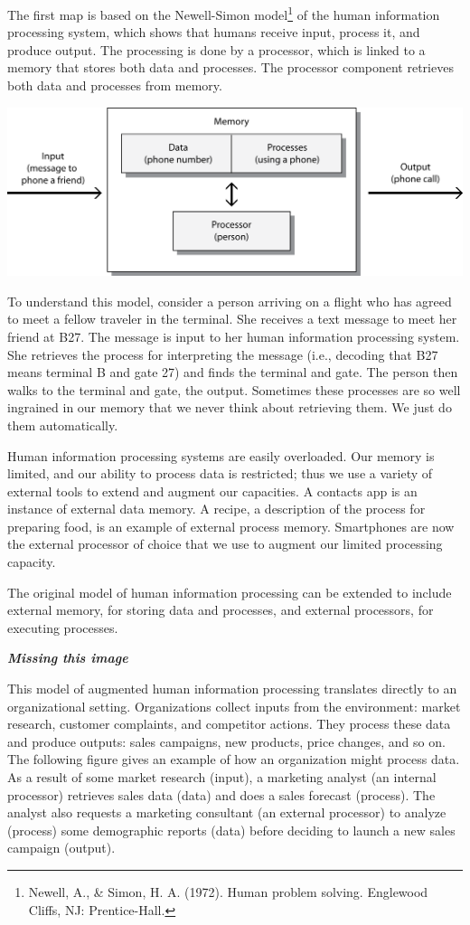 \documentclass[
]{article}
\begin{document}
The first map is based on the Newell-Simon model\footnote{Newell, A., \& Simon, H. A. (1972). Human problem solving.
  Englewood Cliffs, NJ: Prentice-Hall.} of the human
information processing system, which shows that humans receive input,
process it, and produce output. The processing is done by a processor,
which is linked to a memory that stores both data and processes. The
processor component retrieves both data and processes from memory.

\includegraphics{Figures/Section 1/Simon-Newell.png}

To understand this model, consider a person arriving on a flight who has
agreed to meet a fellow traveler in the terminal. She receives a text
message to meet her friend at B27. The message is input to her human
information processing system. She retrieves the process for
interpreting the message (i.e., decoding that B27 means terminal B and
gate 27) and finds the terminal and gate. The person then walks to the
terminal and gate, the output. Sometimes these processes are so well
ingrained in our memory that we never think about retrieving them. We
just do them automatically.

Human information processing systems are easily overloaded. Our memory
is limited, and our ability to process data is restricted; thus we use a
variety of external tools to extend and augment our capacities. A
contacts app is an instance of external data memory. A recipe, a
description of the process for preparing food, is an example of external
process memory. Smartphones are now the external processor of choice
that we use to augment our limited processing capacity.

The original model of human information processing can be extended to
include external memory, for storing data and processes, and external
processors, for executing processes.

\textbf{\emph{Missing this image}}

This model of augmented human information processing translates directly
to an organizational setting. Organizations collect inputs from the
environment: market research, customer complaints, and competitor
actions. They process these data and produce outputs: sales campaigns,
new products, price changes, and so on. The following figure gives an
example of how an organization might process data. As a result of some
market research (input), a marketing analyst (an internal processor)
retrieves sales data (data) and does a sales forecast (process). The
analyst also requests a marketing consultant (an external processor) to
analyze (process) some demographic reports (data) before deciding to
launch a new sales campaign (output).
\end{document}
